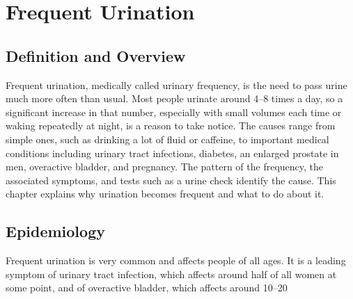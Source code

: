 \chapter{Frequent Urination}

\section*{Definition and Overview}
Frequent urination, medically called urinary frequency, is the need to pass urine much more often than usual. Most people urinate around 4--8 times a day, so a significant increase in that number, especially with small volumes each time or waking repeatedly at night, is a reason to take notice. The causes range from simple ones, such as drinking a lot of fluid or caffeine, to important medical conditions including urinary tract infections, diabetes, an enlarged prostate in men, overactive bladder, and pregnancy. The pattern of the frequency, the associated symptoms, and tests such as a urine check identify the cause. This chapter explains why urination becomes frequent and what to do about it.

\section*{Epidemiology}
Frequent urination is very common and affects people of all ages. It is a leading symptom of urinary tract infection, which affects around half of all women at some point, and of overactive bladder, which affects around 10--20%

